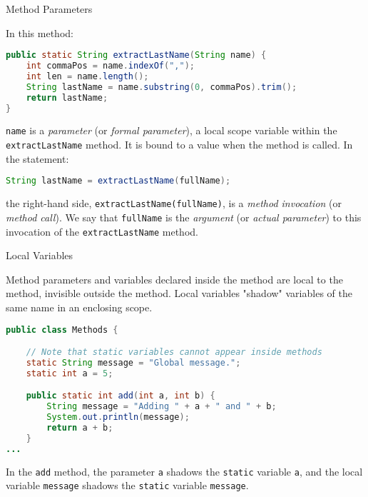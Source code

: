 \documentclass{beamer}
\begin{document}
\begin{frame}[fragile]{Method Parameters}

In this method:
\begin{lstlisting}[language=Java]
public static String extractLastName(String name) {
    int commaPos = name.indexOf(",");
    int len = name.length();
    String lastName = name.substring(0, commaPos).trim();
    return lastName;
}
\end{lstlisting}
{\tt name} is a {\it parameter} (or {\it formal parameter}), a local scope variable within the {\tt extractLastName} method.  It is bound to a value when the method is called.  In the statement:

\begin{lstlisting}[language=Java]
String lastName = extractLastName(fullName);
\end{lstlisting}
the right-hand side, {\tt extractLastName(fullName)}, is a {\it method invocation} (or {\it method call}).  We say that {\tt fullName} is the {\it argument} (or {\it actual parameter}) to this invocation of the {\tt extractLastName} method.

\end{frame}

\begin{frame}[fragile]{Local Variables}

Method parameters and variables declared inside the method are local to the method, invisible outside the method.  Local variables "shadow" variables of the same name in an enclosing scope.

\begin{lstlisting}[language=Java]
public class Methods {

    // Note that static variables cannot appear inside methods
    static String message = "Global message.";
    static int a = 5;

    public static int add(int a, int b) {
        String message = "Adding " + a + " and " + b;
        System.out.println(message);
        return a + b;
    }
...
\end{lstlisting}
In the {\tt add} method, the parameter {\tt a} shadows the {\tt static} variable {\tt a}, and the local variable {\tt message} shadows the {\tt static} variable {\tt message}.

\end{frame}
\end{document}
